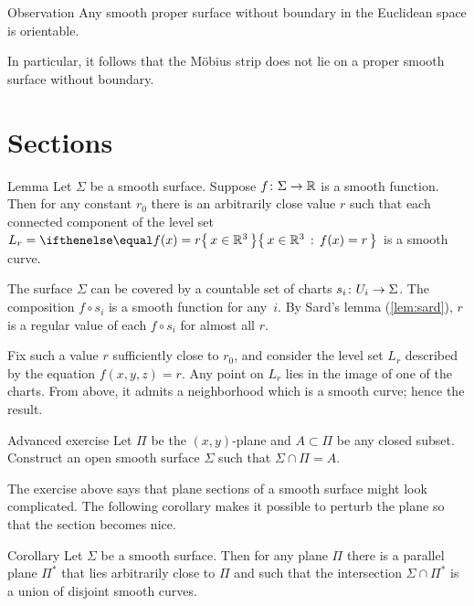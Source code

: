 \begin{thm}{Observation}
Any smooth proper surface without boundary in the Euclidean space is orientable.
\end{thm}

In particular, it follows that the Möbius strip does not lie on a proper smooth surface without boundary.

\section{Sections}

\begin{thm}{Lemma}\label{lem:reg-section}
Let $\Sigma$ be a smooth surface.
Suppose $f\:\Sigma\z\to\mathbb{R}$ is a smooth function.
Then for any constant $r_0$ there is an arbitrarily close value $r$ such that 
each connected component of the level set $L_r=\set{x\in\mathbb{R}^3}{f(x)=r}$ is a smooth curve.
\end{thm}

The surface $\Sigma$ can be covered by a countable set of charts $s_i\:U_i\z\to \Sigma$.
The composition $f\circ s_i$ is a smooth function for any~$i$.
By Sard's lemma (\ref{lem:sard}), $r$ is a regular value of each $f\circ s_i$ for almost all $r$.

Fix such a value $r$ sufficiently close to $r_0$, and consider the level set $L_r$ described by the equation $f(x,y,z)=r$.
Any point on $L_r$ lies in the image of one of the charts.
From above, it admits a neighborhood which is a smooth curve;
hence the result.
\qeds

\begin{thm}{Advanced exercise}\label{ex:plane-section}
Let $\Pi$ be the $(x,y)$-plane and $A \subset \Pi$ be any closed subset.
Construct an open smooth surface $\Sigma$ such that $\Sigma \cap \Pi = A$.
\end{thm}

The exercise above says that plane sections of a smooth surface might look complicated.
The following corollary makes it possible to perturb the plane so that the section becomes nice.

\begin{thm}{Corollary}
Let $\Sigma$ be a smooth surface.
Then for any plane $\Pi$ there is a parallel plane $\Pi^{*}$ that lies arbitrarily close to $\Pi$ and such that the intersection $\Sigma\cap\Pi^{*}$ is a union of disjoint smooth curves.
\end{thm}



